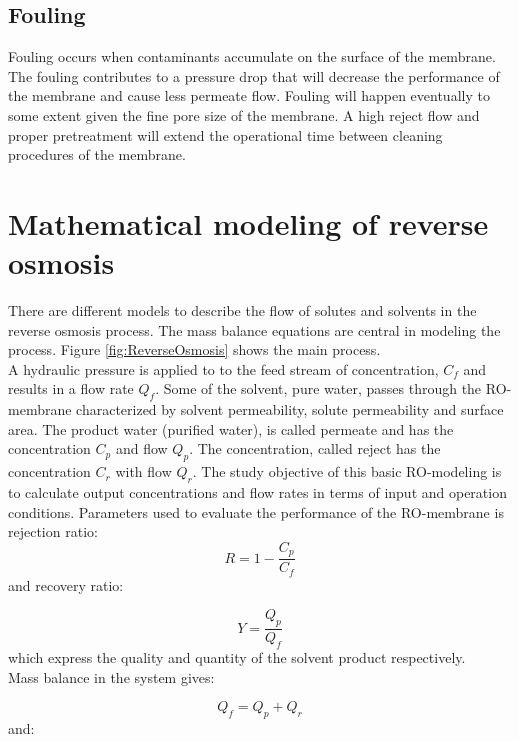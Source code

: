 \subsection{Fouling}
Fouling occurs when contaminants accumulate on the surface of the membrane. The fouling contributes to a pressure drop that will decrease the performance of the membrane and cause less permeate flow. Fouling will happen eventually to some extent given the fine pore size of the membrane. A high reject flow and proper pretreatment will extend the operational time between cleaning procedures of the membrane\cite{Puretech}. 

\section{Mathematical modeling of reverse osmosis} 
\label{soldiff}
There are different models to describe the flow of solutes and solvents in the reverse osmosis process. The mass balance equations are central in modeling the process. Figure \ref{fig:ReverseOsmosis} shows the main process. \\

A hydraulic pressure is applied to to the feed stream of concentration, $C_{f}$ and results in a flow rate $Q_{f}$. Some of the solvent, pure water, passes through the RO-membrane  characterized by solvent permeability, solute permeability and surface area. The product water (purified water), is called permeate and has the concentration $C_p$ and flow $Q_p$. The concentration, called reject has the concentration $C_r$ with flow $Q_r$. The study objective of this basic RO-modeling is to calculate output concentrations and flow rates in terms of input and operation conditions. Parameters used to evaluate the performance of the RO-membrane is rejection ratio:
\begin{equation}
\label{eq:rejection}
R=1-\frac{C_{p}}{C_{f}}
\end{equation}
and recovery ratio:

\begin{equation}
\label{eq:recovery}
Y=\frac{Q_{p}}{Q_{f}}
\end{equation}
which express the quality and quantity of the solvent product respectively. 
\\Mass balance in the system gives:

\begin{equation}
\label{eq:feedflow}
Q_{f}=Q_{p}+Q_{r}
\end{equation}
and:

